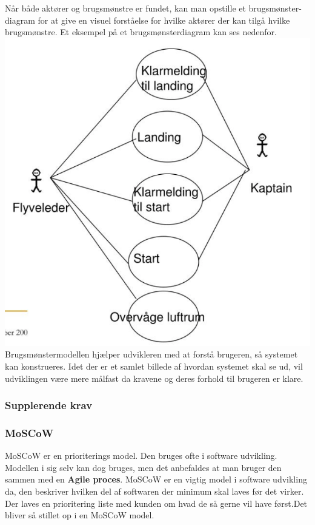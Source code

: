 Når både aktører og brugsmønstre er fundet, kan man opstille et brugsmønster-diagram for at give en visuel forståelse for hvilke aktører der kan tilgå hvilke brugsmønstre. Et eksempel på et brugsmønsterdiagram kan ses nedenfor. \\
\includegraphics[scale=1]{figures/2. Faglig vidensgrundlag/UseCaseExample.png} \\

Brugsmønstermodellen hjælper udvikleren med at forstå brugeren, så systemet kan konstrueres. Idet der er et samlet billede af hvordan systemet skal se ud, vil udviklingen være mere målfast da kravene og deres forhold til brugeren er klare.

\subsubsection{Supplerende krav} %


\subsubsection{MoSCoW} %
MoSCoW er en prioriterings model. Den bruges ofte i software udvikling. 
Modellen i sig selv kan dog bruges, men det anbefaldes at man bruger den sammen med en \textbf{Agile proces}. 
MoSCoW er en vigtig model i software udvikling da, den beskriver hvilken del af softwaren der minimum skal laves før det virker. Der laves en prioritering liste med kunden om hvad de så gerne vil have først.Det bliver så stillet op i en MoSCoW model.

